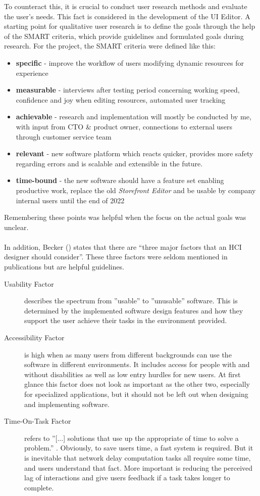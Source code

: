 To counteract this, it is crucial to conduct user research methods and evaluate the user's needs.
This fact is considered in the development of the UI Editor.
A starting point for qualitative user research is to define the goals through the help of the SMART criteria, which provide guidelines and formulated goals during research.
For the project, the SMART criteria were defined like this:
\label{fig:smart}
\begin{itemize}
  \item \textbf{specific} - improve the workflow of users modifying dynamic resources for \Gls{experience}
  \item \textbf{measurable} - interviews after testing period concerning working speed, confidence and joy when editing resources, automated user tracking
  \item \textbf{achievable} - research and implementation will mostly be conducted by me, with input from CTO \& product owner, connections to external users through customer service team
  \item \textbf{relevant} - new software platform which reacts quicker, provides more safety regarding errors and is scalable and extensible in the future.
  \item \textbf{time-bound} - the new software should have a feature set enabling productive work, replace the old \textit{Storefront Editor} and be usable by company internal users until the end of 2022
\end{itemize}
Remembering these points was helpful when the focus on the actual goals was unclear.
\\\\
In addition, Becker (\cite[pp. 37-41]{LearnHCI:2020ys}) states that there are ``three major factors that an HCI designer should consider''.
These three factors were seldom mentioned in publications but are helpful guidelines.
\begin{description}
  \item[Usability Factor] describes the spectrum from ''usable'' to ''unusable'' software. This is determined by the implemented software design features and how they support the user achieve their tasks in the environment provided.
  \item[Accessibility Factor] is high when as many users from different backgrounds can use the software in different environments. 
  It includes access for people with and without disabilities as well as low entry hurdles for new users.
  At first glance this factor does not look as important as the other two, especially for specialized applications, but it should not be left out when designing and implementing software.
  \item[Time-On-Task Factor] refers to ''[...] solutions that use up the appropriate of time to solve a problem.'' \Cite[p. 40]{LearnHCI:2020ys}. Obviously, to save users time, a fast system is required.
But it is inevitable that network delay computation tasks all require some time, and users understand that fact. More important is reducing the perceived lag of interactions and give users feedback if a task takes longer to complete.
\end{description}

